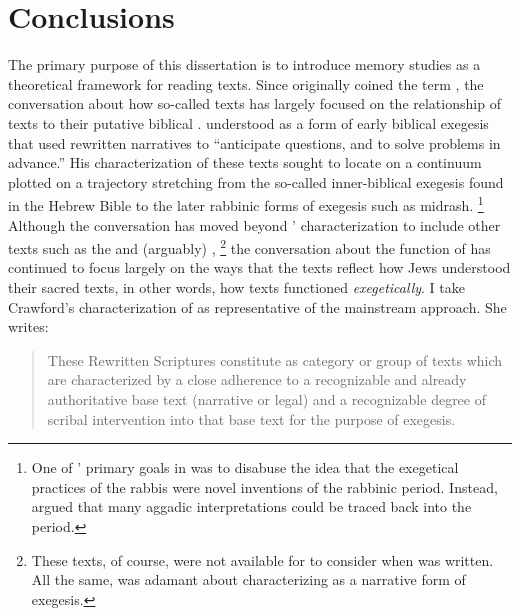 
\chapter*{Conclusions}


The primary purpose of this dissertation is to introduce memory studies as a theoretical framework for reading \rwb texts. Since \Vermes originally coined the term \rwb, the conversation about how so-called \rwb texts has largely focused on the relationship of \rwb texts to their putative biblical \vorlagen. \vermes understood \rwb as a form of early biblical exegesis that used rewritten narratives to ``anticipate questions, and to solve problems in advance.''%
    \autocite[95]{vermes1961}
His characterization of these texts sought to locate \rwb on a continuum plotted on a trajectory stretching from the so-called inner-biblical exegesis found in the Hebrew Bible to the later rabbinic forms of exegesis such as midrash.%
    \footnote{One of \vermes' primary goals in  was to disabuse the idea that the exegetical practices of the rabbis were novel inventions of the rabbinic period. Instead, \vermes argued that many aggadic interpretations could be traced back into the \secondtemple period.}
Although the conversation has moved beyond \vermes' characterization to include other texts such as the \templescroll and (arguably) ,%
    \footnote{These texts, of course, were not available for \vermes to consider when  was written. All the same, \vermes was adamant about characterizing \rwb as a narrative form of exegesis.}    
the conversation about the function of \rwb has continued to focus largely on the ways that the \rwb texts reflect how \secondtemple Jews understood their sacred texts, in other words, how \rwb texts functioned \emph{exegetically}. I take Crawford's characterization of \rwb as representative of the mainstream approach. She writes:
\begin{quote}
    These Rewritten Scriptures constitute as category or group of texts which are characterized by a close adherence to a recognizable and already authoritative base text (narrative or legal) and a recognizable degree of scribal intervention into that base text for the purpose of exegesis.\autocite[12--13]{crawford2008}
\end{quote}
